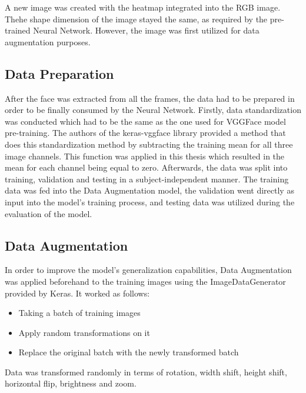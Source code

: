 A new image was created with the heatmap integrated into the RGB image. Thehe shape dimension of the image stayed the same, as required by the pre-trained Neural Network. However, the image was first utilized for data augmentation purposes.

\subsection{Data Preparation}
After the face was extracted from all the frames, the data had to be prepared in order to be finally consumed by the Neural Network.
\newline\newline
Firstly, data standardization was conducted which had to be the same as the one used for VGGFace model pre-training. The authors of the keras-vggface library provided a method that does this standardization method by subtracting the training mean for all three image channels. This function was applied in this thesis which resulted in the mean for each channel being equal to zero.
\newline\newline
Afterwards, the data was split into training, validation and testing in a subject-independent manner. The training data was fed into the Data Augmentation model, the validation went directly as input into the model's training process, and testing data was utilized during the evaluation of the model.

\subsection{Data Augmentation}
In order to improve the model's generalization capabilities, Data Augmentation was applied beforehand to the training images using the ImageDataGenerator provided by Keras. It worked as follows:
\begin{itemize}
    \item Taking a batch of training images
    \item Apply random transformations on it
    \item Replace the original batch with the newly transformed batch
\end{itemize}
Data was transformed randomly in terms of rotation, width shift, height shift, horizontal flip, brightness and zoom.

